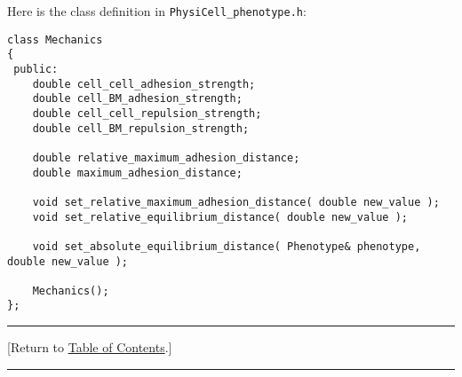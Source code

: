 \documentclass[12pt]{article}
\renewcommand{\v}{\verb}
\newcommand{\TOClink}{\begin{center}\hrule\vskip-10pt\phantom{.}\hfill[Return to \hyperlink{TOC}{Table of Contents}.]\hfill\phantom{.}\vskip3pt\hrule\end{center}}
\begin{document}
Here is the class definition in \v|PhysiCell_phenotype.h|:
\begin{verbatim}
class Mechanics
{
 public:
    double cell_cell_adhesion_strength; 
    double cell_BM_adhesion_strength;
    double cell_cell_repulsion_strength;
    double cell_BM_repulsion_strength; 
    
    double relative_maximum_adhesion_distance; 
    double maximum_adhesion_distance;
	
    void set_relative_maximum_adhesion_distance( double new_value );  
    void set_relative_equilibrium_distance( double new_value );  
	
    void set_absolute_equilibrium_distance( Phenotype& phenotype, double new_value );  
    
    Mechanics();      
};

\end{verbatim}
\TOClink
\end{document}
